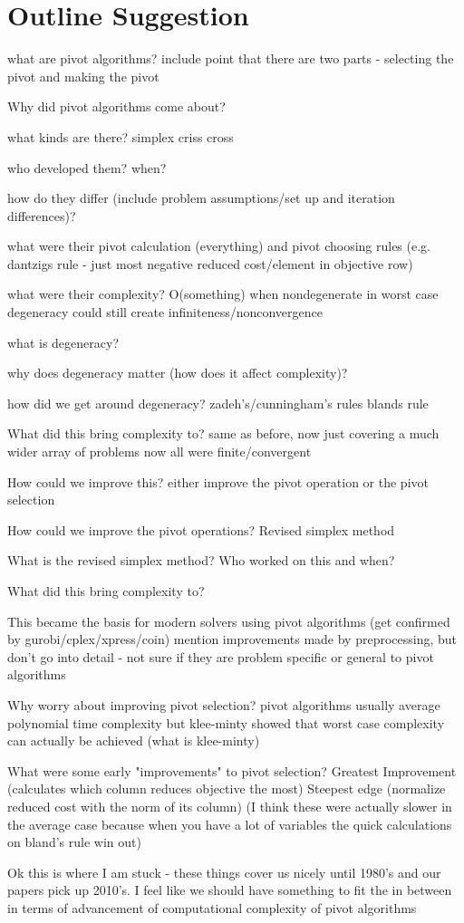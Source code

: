 \documentclass[11pt]{article}
\begin{document}

 

\section{Outline Suggestion}
what are pivot algorithms?
include point that there are two parts - selecting the pivot and making the pivot

Why did pivot algorithms come about?

what kinds are there?
simplex
criss cross

who developed them? when?

how do they differ (include problem assumptions/set up and iteration differences)?

what were their pivot calculation (everything) and pivot choosing rules (e.g. dantzigs rule - just most negative reduced cost/element in objective row)

what were their complexity?
O(something) when nondegenerate in worst case
degeneracy could still create infiniteness/nonconvergence

what is degeneracy?

why does degeneracy matter (how does it affect complexity)?

how did we get around degeneracy?
zadeh's/cunningham's rules
blands rule

What did this bring complexity to?
same as before, now just covering a much wider array of problems
now all were finite/convergent

How could we improve this?
either improve the pivot operation or the pivot selection

How could we improve the pivot operations?
Revised simplex method

What is the revised simplex method? Who worked on this and when?

What did this bring complexity to?

This became the basis for modern solvers using pivot algorithms (get confirmed by gurobi/cplex/xpress/coin)
mention improvements made by preprocessing, but don't go into detail - not sure if they are problem specific or general to pivot algorithms

Why worry about improving pivot selection?
pivot algorithms usually average polynomial time complexity
but klee-minty showed that worst case complexity can actually be achieved
(what is klee-minty)

What were some early "improvements" to pivot selection?
Greatest Improvement (calculates which column reduces objective the most)
Steepest edge (normalize reduced cost with the norm of its column)
(I think these were actually slower in the average case because when you have a lot of variables the quick calculations on bland's rule win out)

Ok this is where I am stuck - these things cover us nicely until 1980's and our papers pick up 2010's. I feel like we should have something to fit the in between in terms of advancement of computational complexity of pivot algorithms
\end{document}
